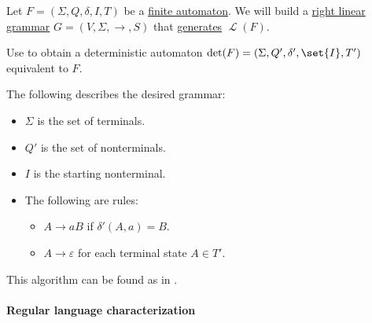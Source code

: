 \begin{algorithm}\label{alg:finite_automaton_to_right_linear_grammar}
  Let \( F = (\Sigma, Q, \delta, I, T) \) be a \hyperref[def:finite_automaton]{finite automaton}. We will build a \hyperref[def:chomsky_hierarchy/regular]{right linear grammar} \( G = (V, \Sigma, \to, S) \) that \hyperref[def:formal_grammar/language]{generates} \( \mscrL(F) \).

  \begin{thmenum}
     Use  to obtain a deterministic automaton \( \det(F) = (\Sigma, Q', \delta', \set{ I }, T') \) equivalent to \( F \).

     The following describes the desired grammar:
    \begin{itemize}
      \item \( \Sigma \) is the set of terminals.
      \item \( Q' \) is the set of nonterminals.
      \item \( I \) is the starting nonterminal.
      \item The following are rules:
      \begin{itemize}
        \item \( A \to aB \) if \( \delta'(A, a) = B \).
        \item \( A \to \varepsilon \) for each terminal state \( A \in T' \).
      \end{itemize}
    \end{itemize}
  \end{thmenum}
\end{algorithm}
\begin{comments}
  \item This algorithm can be found as  in \cite{code}.
\end{comments}

\paragraph{Regular language characterization}


